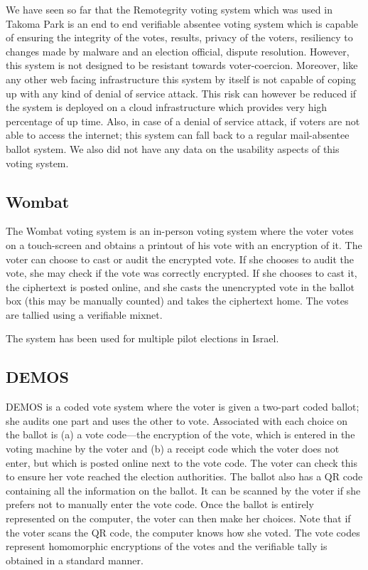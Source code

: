 We have seen so far that the Remotegrity voting system which was used
in Takoma Park is an end to end verifiable absentee voting system
which is capable of ensuring the integrity of the votes, results,
privacy of the voters, resiliency to changes made by malware and an
election official, dispute resolution. However, this system is not
designed to be resistant towards voter-coercion. Moreover, like any
other web facing infrastructure this system by itself is not capable
of coping up with any kind of denial of service attack. This risk can
however be reduced if the system is deployed on a cloud infrastructure
which provides very high percentage of up time. Also, in case of a
denial of service attack, if voters are not able to access the
internet; this system can fall back to a regular mail-absentee ballot
system. We also did not have any data on the usability aspects of this
voting system.

\subsection{Wombat~\cite{rosen2011}}

The Wombat voting system is an in-person voting system where the voter
votes on a touch-screen and obtains a printout of his vote with an
encryption of it. The voter can choose to cast or audit the encrypted
vote. If she chooses to audit the vote, she may check if the vote was
correctly encrypted. If she chooses to cast it, the ciphertext is
posted online, and she casts the unencrypted vote in the ballot box
(this may be manually counted) and takes the ciphertext home. The
votes are tallied using a verifiable mixnet.

The system has been used for multiple pilot elections in Israel.

\subsection{DEMOS~\cite{kiayias2014}}

DEMOS is a coded vote system where the voter is given a two-part coded
ballot; she audits one part and uses the other to vote. Associated
with each choice on the ballot is (a) a vote code---the encryption of
the vote, which is entered in the voting machine by the voter and (b)
a receipt code which the voter does not enter, but which is posted
online next to the vote code.  The voter can check this to ensure her
vote reached the election authorities. The ballot also has a QR code
containing all the information on the ballot. It can be scanned by the
voter if she prefers not to manually enter the vote code. Once the
ballot is entirely represented on the computer, the voter can then
make her choices. Note that if the voter scans the QR code, the
computer knows how she voted. The vote codes represent homomorphic
encryptions of the votes and the verifiable tally is obtained in a
standard manner.

